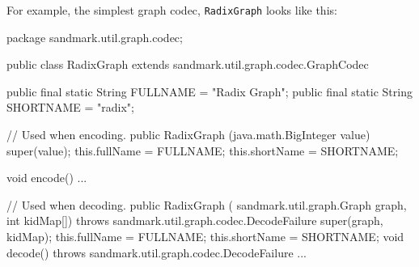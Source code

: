 For example, the simplest graph codec, {\tt RadixGraph}
looks like this:
\begin{listing}{1}
package sandmark.util.graph.codec;

public class RadixGraph extends sandmark.util.graph.codec.GraphCodec {

    public final static String FULLNAME  = "Radix Graph";
    public final static String SHORTNAME = "radix";

// Used when encoding.
public RadixGraph (java.math.BigInteger value)  {
    super(value);
    this.fullName = FULLNAME;
    this.shortName = SHORTNAME;
}

void encode() { ... }

// Used when decoding.
   public RadixGraph (
       sandmark.util.graph.Graph graph, 
       int kidMap[]) throws sandmark.util.graph.codec.DecodeFailure {
       super(graph, kidMap);
       this.fullName = FULLNAME;
       this.shortName = SHORTNAME;
   }
   void decode() throws sandmark.util.graph.codec.DecodeFailure { ... }
}
\end{listing}

